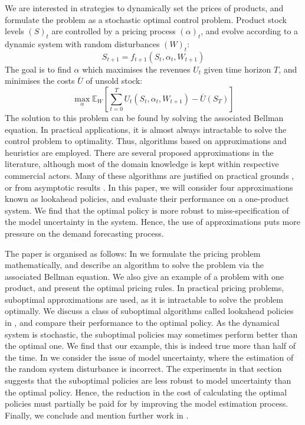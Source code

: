 \documentclass[main.tex]{subfiles}
\begin{document}
We are interested in strategies to dynamically set the prices of products, and
formulate the problem as a stochastic optimal control problem.
Product stock levels ${(S)}_t$ are controlled by a pricing process
${(\alpha)}_t$, and evolve according to a dynamic system with random disturbances
${(W)}_t$:
\begin{equation}
S_{t+1}=f_{t+1}(S_t,\alpha_t,W_{t+1})
\end{equation}
The goal is to find $\alpha$ which maximises the revenues $U_t$
given time horizon $T$, and
minimises the costs $\overline{U}$ of unsold stock:
\begin{equation}
  \max_{\alpha}\mathbb E_W\left[ \sum_{t=0}^TU_t(S_t,\alpha_t,W_{t+1})
  - \overline{U}(S_T)\right]
\end{equation}
The solution to this problem can be found by solving the associated
Bellman equation. In practical applications, it is almost always
intractable to solve the control problem to optimality.
Thus, algorithms based on approximations and heuristics are employed.
There are several proposed approximations in the
literature, although most of the domain knowledge is kept within
respective commercial actors.
Many of these algorithms are justified on practical grounds
\citep{aviv2012dynamic}, or
from asymptotic results \citep{gallego1994optimal}.
In this paper, we will consider four approximations known as
lookahead policies,
and evaluate their performance on a one-product system.
We find that the optimal policy is more robust to
miss-specification of the model uncertainty in the system.
Hence, the use of approximations puts more pressure on the
demand forecasting process.

The paper is organised as follows:
In  we formulate the
pricing problem mathematically, and describe an algorithm to solve the
problem via the associated Bellman equation. We also give an example
of a problem with one product, and present the optimal pricing rules.
In practical pricing problems, suboptimal approximations are used, as it is intractable to
solve the problem optimally. We discuss a class of suboptimal
algorithms called lookahead policies in
, and compare their performance to
the optimal policy. As the dynamical system is stochastic, the
suboptimal policies may sometimes perform better than the optimal
one. We find that our example, this is indeed true more than half of
the time.
In  we consider the issue of
model uncertainty, where the estimation of the random system
disturbance is incorrect. The experiments in that section suggests
that the suboptimal policies are less robust to model uncertainty
than the optimal policy. Hence, the reduction in the cost
of calculating the optimal policies must partially be paid for
by improving the model estimation process.
Finally, we conclude and mention further work in .

\biblio
\end{document}
